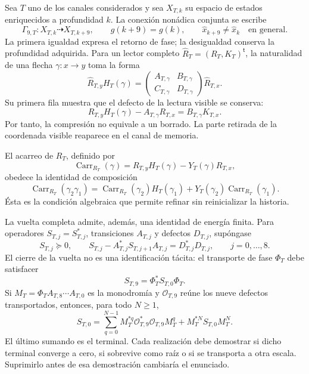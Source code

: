 Sea \(T\) uno de los canales considerados y sea
\(X_{T,k}\) su espacio de estados enriquecidos a profundidad \(k\). La
conexión nonádica conjunta se escribe
\begin{equation}\label{eq:realizaciones-gamma9}
 \Gamma_{9,T}:X_{T,k}\dashrightarrow X_{T,k+9},
 \qquad g(k+9)=g(k),
 \qquad \widehat x_{k+9}\neq\widehat x_k
 \quad\text{en general}.
\end{equation}
La primera igualdad expresa el retorno de fase; la desigualdad conserva la
profundidad adquirida. Para un lector completo
\(\widehat R_T=(R_T,K_T)^{\mathsf t}\), la naturalidad de una flecha
\(\gamma:x\to y\) toma la forma
\begin{equation}\label{eq:realizaciones-lrdn}
 \widehat R_{T,y}H_T(\gamma)=
 \begin{pmatrix}
  A_{T,\gamma}&B_{T,\gamma}\\
  C_{T,\gamma}&D_{T,\gamma}
 \end{pmatrix}
 \widehat R_{T,x}.
\end{equation}
Su primera fila muestra que el defecto de la lectura visible se conserva:
\begin{equation}\label{eq:realizaciones-defecto-visible}
 R_{T,y}H_T(\gamma)-A_{T,\gamma}R_{T,x}
 =B_{T,\gamma}K_{T,x}.
\end{equation}
Por tanto, la compresión no equivale a un borrado. La parte retirada de la
coordenada visible reaparece en el canal de memoria.

El acarreo de \(R_T\), definido por
\[
 \operatorname{Carr}_{R_T}(\gamma)
 =R_{T,y}H_T(\gamma)-Y_T(\gamma)R_{T,x},
\]
obedece la identidad de composición
\begin{equation}\label{eq:realizaciones-cociclo-acarreo}
 \operatorname{Carr}_{R_T}(\gamma_2\gamma_1)
 =\operatorname{Carr}_{R_T}(\gamma_2)H_T(\gamma_1)
 +Y_T(\gamma_2)\operatorname{Carr}_{R_T}(\gamma_1).
\end{equation}
Ésta es la condición algebraica que permite refinar sin reinicializar la
historia.

La vuelta completa admite, además, una identidad de energía finita. Para
operadores \(S_{T,j}=S_{T,j}^*\), transiciones \(A_{T,j}\) y defectos
\(D_{T,j}\), supóngase
\[
 S_{T,j}\succeq0,
 \qquad
 S_{T,j}-A_{T,j}^*S_{T,j+1}A_{T,j}=D_{T,j}^*D_{T,j},
 \qquad j=0,\ldots,8.
\]
El cierre de la vuelta no es una identificación tácita: el transporte de
fase \(\Phi_T\) debe satisfacer
\begin{equation}\label{eq:realizaciones-cierre-forma}
 S_{T,9}=\Phi_T^*S_{T,0}\Phi_T.
\end{equation}
Si \(M_T=\Phi_TA_{T,8}\cdots A_{T,0}\) es la monodromía y
\(\mathcal O_{T,9}\) reúne los nueve defectos transportados, entonces, para
todo \(N\geq1\),
\begin{equation}\label{eq:realizaciones-telescopia-terminal}
 S_{T,0}
 =\sum_{q=0}^{N-1}
 M_T^{*q}\mathcal O_{T,9}^*\mathcal O_{T,9}M_T^q
 +M_T^{*N}S_{T,0}M_T^N.
\end{equation}
El último sumando es el terminal. Cada realización debe demostrar si dicho
terminal converge a cero, si sobrevive como raíz o si se transporta a otra
escala. Suprimirlo antes de esa demostración cambiaría el enunciado.

